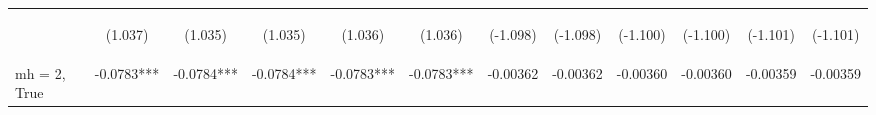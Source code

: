 \documentclass[]{article}
\begin{document}
\begin{center}
\begin{tabular}{lccccccccccc}
        \vspace{4pt}     & \begin{footnotesize}(1.037)\end{footnotesize}  & \begin{footnotesize}(1.035)\end{footnotesize}  & \begin{footnotesize}(1.035)\end{footnotesize}  & \begin{footnotesize}(1.036)\end{footnotesize}  & \begin{footnotesize}(1.036)\end{footnotesize}  & \begin{footnotesize}(-1.098)\end{footnotesize}  & \begin{footnotesize}(-1.098)\end{footnotesize}  & \begin{footnotesize}(-1.100)\end{footnotesize} & \begin{footnotesize}(-1.100)\end{footnotesize} & \begin{footnotesize}(-1.101)\end{footnotesize} & \begin{footnotesize}(-1.101)\end{footnotesize} \\
        mh = 2, True     & -0.0783***                                     & -0.0784***                                     & -0.0784***                                     & -0.0783***                                     & -0.0783***                                     & -0.00362                                        & -0.00362                                        & -0.00360                                       & -0.00360                                       & -0.00359                                       & -0.00359                                       \\

\end{tabular}
\end{center}
\end{document}
